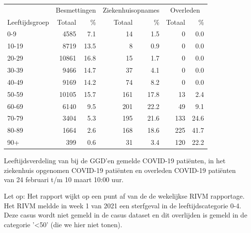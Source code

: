 \documentclass[
  english,
  man,floatsintext]{apa6}
\begin{document}
\begin{table}
\centering\begingroup\fontsize{11}{13}\selectfont

\begin{threeparttable}
\begin{tabular}{lrrrrrr}
\toprule
\multicolumn{1}{c}{ } & \multicolumn{2}{c}{Besmettingen} & \multicolumn{2}{c}{Ziekenhuisopnames} & \multicolumn{2}{c}{Overleden} \\
\cmidrule(l{3pt}r{3pt}){2-3} \cmidrule(l{3pt}r{3pt}){4-5} \cmidrule(l{3pt}r{3pt}){6-7}
Leeftijdsgroep & Totaal & \% & Totaal & \% & Totaal & \%\\
\midrule
0-9 & 4585 & 7.1 & 14 & 1.5 & 0 & 0.0\\
10-19 & 8719 & 13.5 & 8 & 0.9 & 0 & 0.0\\
20-29 & 10861 & 16.8 & 15 & 1.7 & 0 & 0.0\\
30-39 & 9466 & 14.7 & 37 & 4.1 & 0 & 0.0\\
40-49 & 9169 & 14.2 & 74 & 8.2 & 0 & 0.0\\
50-59 & 10105 & 15.7 & 161 & 17.8 & 13 & 2.4\\
60-69 & 6140 & 9.5 & 201 & 22.2 & 49 & 9.1\\
70-79 & 3404 & 5.3 & 195 & 21.6 & 133 & 24.6\\
80-89 & 1664 & 2.6 & 168 & 18.6 & 225 & 41.7\\
90+ & 399 & 0.6 & 31 & 3.4 & 120 & 22.2\\
\bottomrule
\end{tabular}
\begin{tablenotes}
\item[1] Leeftijdsverdeling van bij de GGD’en gemelde COVID-19 patiënten, in het ziekenhuis opgenomen COVID-19 patiënten en overleden COVID-19 patiënten van 24 februari t/m 10 maart 10:00 uur.
\item[2] Let op: Het rapport wijkt op een punt af van de de wekelijkse RIVM rapportage. Het RIVM meldde in week 1 van 2021 een sterfgeval in de leeftijdscategorie 0-4. Deze casus wordt niet gemeld in de casus dataset en dit overlijden is gemeld in de categorie '<50' (die we hier niet tonen).
\end{tablenotes}
\end{threeparttable}
\endgroup{}
\end{table}

\newpage
\end{document}
